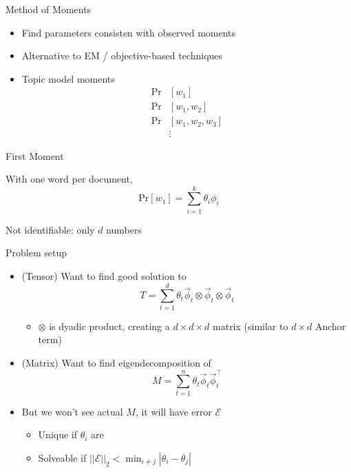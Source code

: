 \documentclass[compress]{beamer}
\begin{document}
\begin{frame}{Method of Moments}

  \begin{itemize}
    \item Find parameters consisten with observed moments
    \item Alternative to EM / objective-based techniques
    \item Topic model moments
      \begin{align}
        \mbox{Pr}&[w_1] \\
        \mbox{Pr}&[w_1, w_2] \\
        \mbox{Pr}&[w_1, w_2, w_3] \\
        & \vdots
      \end{align}

  \end{itemize}

\end{frame}

\begin{frame}{First Moment}

  With one word per document,
  \begin{equation}
    \mbox{Pr}[w_1] = \sum_{i=1}^k \theta_i \phi_i
  \end{equation}

  Not identifiable: only $d$ numbers
\end{frame}


\begin{frame}{Problem setup}

\begin{itemize}
  \item (Tensor) Want to find good solution to
  \begin{equation}
    T = \sum_{t=1}^d \theta_t \vec \phi_t \otimes \vec \phi_t \otimes \vec \phi_t
  \end{equation}
  \begin{itemize}
  \item $\otimes$ is dyadic product, creating a $d \times d \times d$ matrix (similar to $d \times d$ Anchor term)
    \end{itemize}
    \pause
    \item (Matrix) Want to find eigendecomposition of
      \begin{equation}
        M = \sum_{t=1}^n \theta_t \vec \phi_t \vec \phi_t^\top
      \end{equation}
   \item But we won't see actual $M$, it will have error $\mathcal{E}$
     \pause
     \begin{itemize}
       \item Unique if $\theta_i$ are
         \item Solveable if $||\mathcal{E}||_2 < \min_{i\not = j} |\theta_i - \theta_j|$
       \end{itemize}
       \end{itemize}

\end{frame}
\end{document}
